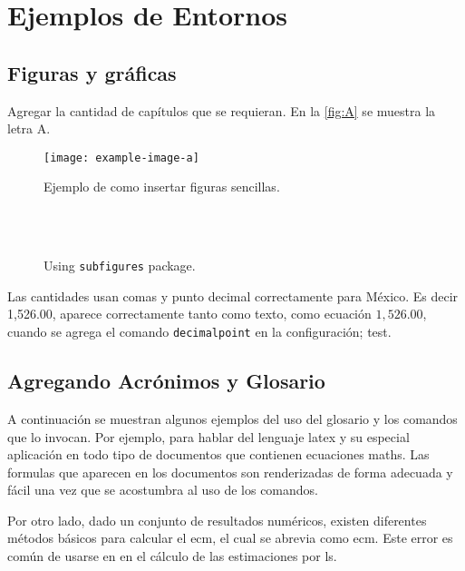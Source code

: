 \chapter{Ejemplos de Entornos} %
\label{ch:MarcoTeorico} 

\section{Figuras y gráficas}
Agregar la cantidad de capítulos que se requieran. En la \autoref{fig:A} se muestra la letra A.


\blindtext[1] %


\begin{figure}[!h]
	\centering
	\texttt{[image: example-image-a]}
	\caption{Ejemplo de como insertar figuras sencillas.}
	\label{fig:A}
\end{figure}

\blindtext[1] %




\begin{figure}[!h]%
\centering
{}%
\\%
%
~ %
%
\caption{Using \texttt{subfigures} package.}
\label{fig:subFigures}
\end{figure}


Las cantidades usan comas y punto decimal correctamente para México. Es decir 1,526.00, aparece correctamente tanto como texto, como ecuación $1,526.00$, cuando se agrega el comando \texttt{decimalpoint} en la configuración; test.

\section{Agregando Acrónimos y Glosario}
A continuación se muestran algunos ejemplos del uso del glosario y los comandos que lo invocan. Por ejemplo, para hablar del lenguaje \Gls{latex} y su especial aplicación en todo tipo de documentos que contienen ecuaciones \gls{maths}. Las \Glspl{formula} que aparecen en los documentos son renderizadas de forma adecuada y fácil una vez que se acostumbra al uso de los comandos.

Por otro lado, dado un conjunto de resultados numéricos, existen diferentes métodos básicos para calcular el \acrlong{ecm}, el cual se abrevia como \acrshort{ecm}. Este error es común de usarse en en el cálculo de las estimaciones por \acrfull{ls}.

